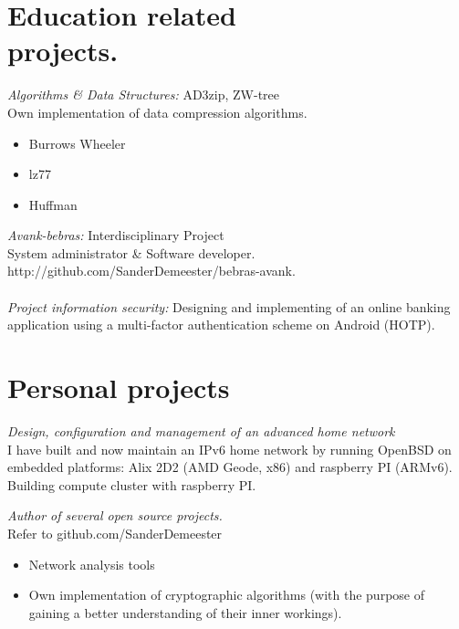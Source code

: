 \documentclass[margin, 10pt]{res} %
\begin{document}
\begin{resume}
\section{Education related \\ projects.} 

{\sl Algorithms \& Data Structures:} AD3zip, ZW-tree \\
Own implementation of data compression algorithms.
\begin{itemize}
\item Burrows Wheeler
\item lz77
\item Huffman
\end{itemize}
{\sl Avank-bebras:} Interdisciplinary Project \\
System administrator \& Software developer. \\
http://github.com/SanderDemeester/bebras-avank.
\\ \\
{\sl Project information security:} Designing and implementing of an online banking application using a multi-factor authentication scheme on Android (HOTP).
 
 
\section{Personal projects}
	
{\sl Design, configuration and management of an advanced home network} \\
I have built and now maintain an IPv6 home network by running OpenBSD on embedded platforms: Alix 2D2 (AMD Geode, x86) and raspberry PI (ARMv6).\\
Building compute cluster with raspberry PI.

{\sl Author of several open source projects.} \\
Refer to github.com/SanderDemeester
\begin{itemize} \itemsep -2pt
\item Network analysis tools
\item Own implementation of cryptographic algorithms (with the purpose of gaining a better understanding of their inner workings).
\end{itemize}


\end{resume}
\end{document}
